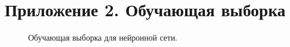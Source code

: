 \section*{Приложение 2. Обучающая выборка}

\begin{figure}[h]
\caption{Обучающая выборка для нейронной сети.}
\label{ris:vibor}
\end{figure}
